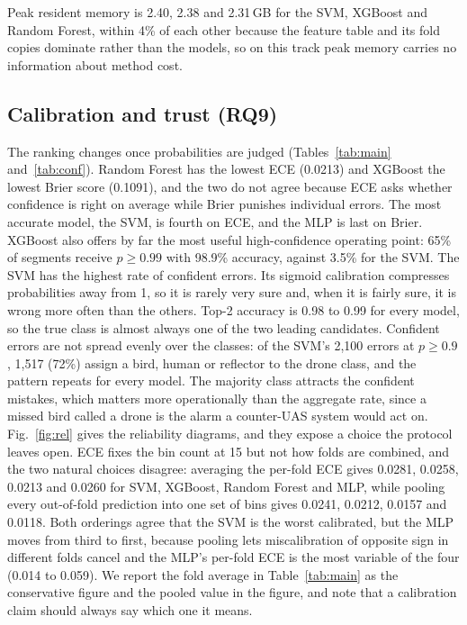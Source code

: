 \documentclass[conference]{IEEEtran}
\begin{document}
Peak resident memory is 2.40, 2.38 and 2.31\,GB for the SVM, XGBoost and Random Forest, within 4\% of each other because the feature table and its fold copies dominate rather than the models, so on this track peak memory carries no information about method cost.

\subsection{Calibration and trust (RQ9)}
The ranking changes once probabilities are judged (Tables~\ref{tab:main} and~\ref{tab:conf}). Random Forest has the lowest ECE (0.0213) and XGBoost the lowest Brier score (0.1091), and the two do not agree because ECE asks whether confidence is right on average while Brier punishes individual errors. The most accurate model, the SVM, is fourth on ECE, and the MLP is last on Brier. XGBoost also offers by far the most useful high-confidence operating point: 65\% of segments receive $p\ge0.99$ with 98.9\% accuracy, against 3.5\% for the SVM. The SVM has the highest rate of confident errors. Its sigmoid calibration compresses probabilities away from 1, so it is rarely very sure and, when it is fairly sure, it is wrong more often than the others. Top-2 accuracy is 0.98 to 0.99 for every model, so the true class is almost always one of the two leading candidates. Confident errors are not spread evenly over the classes: of the SVM's 2,100 errors at $p\ge0.9$, 1,517 (72\%) assign a bird, human or reflector to the drone class, and the pattern repeats for every model. The majority class attracts the confident mistakes, which matters more operationally than the aggregate rate, since a missed bird called a drone is the alarm a counter-UAS system would act on. Fig.~\ref{fig:rel} gives the reliability diagrams, and they expose a choice the protocol leaves open. ECE fixes the bin count at 15 but not how folds are combined, and the two natural choices disagree: averaging the per-fold ECE gives 0.0281, 0.0258, 0.0213 and 0.0260 for SVM, XGBoost, Random Forest and MLP, while pooling every out-of-fold prediction into one set of bins gives 0.0241, 0.0212, 0.0157 and 0.0118. Both orderings agree that the SVM is the worst calibrated, but the MLP moves from third to first, because pooling lets miscalibration of opposite sign in different folds cancel and the MLP's per-fold ECE is the most variable of the four (0.014 to 0.059). We report the fold average in Table~\ref{tab:main} as the conservative figure and the pooled value in the figure, and note that a calibration claim should always say which one it means.
\end{document}
